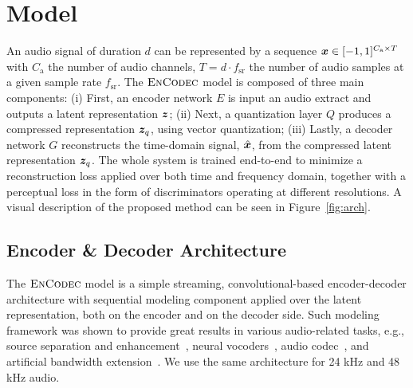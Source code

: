 \section{Model}
An audio signal of duration $d$ can be represented by a sequence $\bm{x}\in [-1, 1]^{C_\mathrm{a}\times T}$ with $C_\mathrm{a}$ the number of audio channels, $T = d\cdot f_\mathrm{sr}$  the number of audio samples at a
given sample rate $f_\mathrm{sr}$.
The $\textsc{EnCodec}~$model is composed of three main components: (i) First, an encoder network $E$ is input an audio extract and outputs a latent representation $\bm{z}$; (ii) Next, a quantization layer $Q$ produces a compressed representation $\bm{z}_q$,  using vector quantization;
(iii) Lastly, a decoder network $G$ reconstructs the time-domain signal, $\hat{\bm{x}}$, from the compressed latent representation $\bm{z}_q$.
The whole system is trained end-to-end to minimize a reconstruction loss applied over both time and frequency domain, together with a perceptual loss in the form of discriminators operating at different resolutions. A visual description of the proposed method can be seen in Figure~\ref{fig:arch}. 

\subsection{Encoder \& Decoder Architecture}
\label{model:encodec}

The $\textsc{EnCodec}~$model is a simple streaming, convolutional-based encoder-decoder architecture with sequential modeling component applied over the latent representation, both on the encoder and on the decoder side. 
Such modeling framework was shown to provide great results in various audio-related tasks, e.g., source separation and enhancement~\citep{defossez2019music, defossez2020real}, neural vocoders~\citep{melgan, hifigan}, audio codec~\citep{zeghidour2021soundstream}, and artificial bandwidth extension~\citep{tagliasacchi2020seanet, li2021real}. We use the same architecture for 24 kHz and 48 kHz audio.


